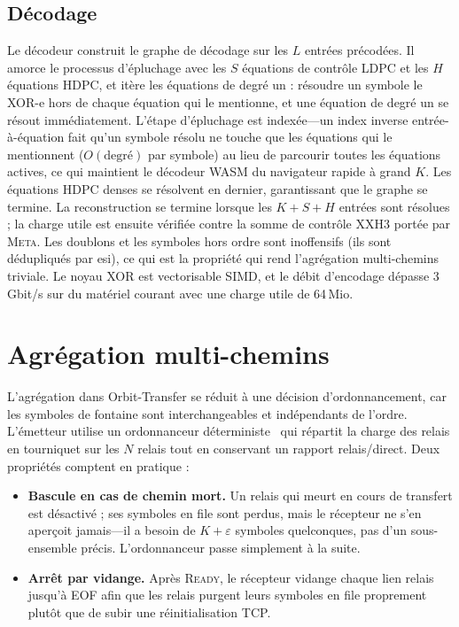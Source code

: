 \documentclass[conference]{IEEEtran}
\begin{document}
\subsection{Décodage}
Le décodeur construit le graphe de décodage sur les $L$ entrées précodées. Il
amorce le processus d'épluchage avec les $S$ équations de contrôle LDPC et les
$H$ équations HDPC, et itère les
équations de degré un : résoudre un symbole le XOR-e hors de chaque équation
qui le mentionne, et une équation de degré un se résout immédiatement. L'étape
d'épluchage est indexée---un index inverse entrée-à-équation fait qu'un symbole
résolu ne touche que les équations qui le mentionnent ($O(\text{degré})$ par
symbole) au lieu de parcourir toutes les équations actives, ce qui maintient le
décodeur WASM du navigateur rapide à grand $K$. Les
équations HDPC denses se résolvent en dernier, garantissant que le graphe se
termine. La reconstruction se termine lorsque les $K+S+H$ entrées sont
résolues ; la charge
utile est ensuite vérifiée contre la somme de contrôle XXH3 portée par
\textsc{Meta}. Les doublons et les symboles hors ordre sont inoffensifs (ils
sont dédupliqués par esi), ce qui est la propriété qui rend l'agrégation
multi-chemins triviale. Le noyau XOR est vectorisable SIMD, et le débit
d'encodage dépasse $3$\,Gbit/s sur du matériel courant avec une charge utile de
64\,Mio.

\section{Agrégation multi-chemins}
\label{sec:agg}

L'agrégation dans Orbit-Transfer se réduit à une décision d'ordonnancement,
car les symboles de fontaine sont interchangeables et indépendants de l'ordre.
L'émetteur utilise un ordonnanceur déterministe~\cite{maymounkov2002online} qui
répartit la charge des relais en tourniquet sur les $N$ relais tout en
conservant un rapport relais/direct. Deux propriétés comptent en pratique :
\begin{itemize}
\item \textbf{Bascule en cas de chemin mort.} Un relais qui meurt en cours de
transfert est désactivé ; ses symboles en file sont perdus, mais le récepteur
ne s'en aperçoit jamais---il a besoin de $K+\varepsilon$ symboles
quelconques, pas d'un sous-ensemble précis. L'ordonnanceur passe simplement à
la suite.
\item \textbf{Arrêt par vidange.} Après \textsc{Ready}, le récepteur vidange
chaque lien relais jusqu'à EOF afin que les relais purgent leurs symboles en
file proprement plutôt que de subir une réinitialisation TCP.
\end{itemize}
\end{document}
